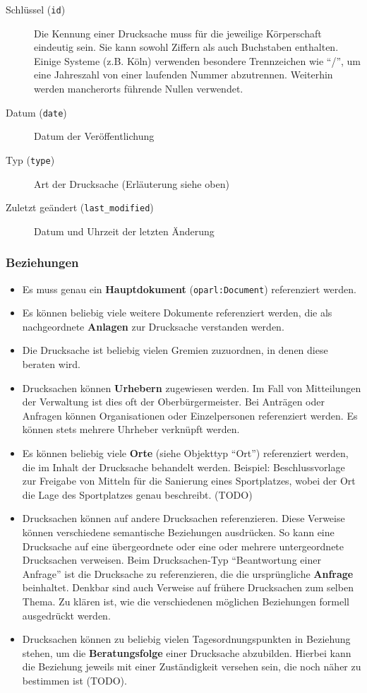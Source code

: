 \documentclass[,a4paper]{article}
\begin{document}
\begin{description}
\item[Schlüssel (\texttt{id})]
Die Kennung einer Drucksache muss für die jeweilige Körperschaft
eindeutig sein. Sie kann sowohl Ziffern als auch Buchstaben enthalten.
Einige Systeme (z.B. Köln) verwenden besondere Trennzeichen wie ``/'',
um eine Jahreszahl von einer laufenden Nummer abzutrennen. Weiterhin
werden mancherorts führende Nullen verwendet.
\item[Datum (\texttt{date})]
Datum der Veröffentlichung
\item[Typ (\texttt{type})]
Art der Drucksache (Erläuterung siehe oben)
\item[Zuletzt geändert (\texttt{last\_modified})]
Datum und Uhrzeit der letzten Änderung
\end{description}

\subsubsection{Beziehungen}

\begin{itemize}
\item
  Es muss genau ein \textbf{Hauptdokument} (\texttt{oparl:Document})
  referenziert werden.
\item
  Es können beliebig viele weitere Dokumente referenziert werden, die
  als nachgeordnete \textbf{Anlagen} zur Drucksache verstanden werden.
\item
  Die Drucksache ist beliebig vielen Gremien zuzuordnen, in denen diese
  beraten wird.
\item
  Drucksachen können \textbf{Urhebern} zugewiesen werden. Im Fall von
  Mitteilungen der Verwaltung ist dies oft der Oberbürgermeister. Bei
  Anträgen oder Anfragen können Organisationen oder Einzelpersonen
  referenziert werden. Es können stets mehrere Uhrheber verknüpft
  werden.
\item
  Es können beliebig viele \textbf{Orte} (siehe Objekttyp ``Ort'')
  referenziert werden, die im Inhalt der Drucksache behandelt werden.
  Beispiel: Beschlussvorlage zur Freigabe von Mitteln für die Sanierung
  eines Sportplatzes, wobei der Ort die Lage des Sportplatzes genau
  beschreibt. (TODO)
\item
  Drucksachen können auf andere Drucksachen referenzieren. Diese
  Verweise können verschiedene semantische Beziehungen ausdrücken. So
  kann eine Drucksache auf eine übergeordnete oder eine oder mehrere
  untergeordnete Drucksachen verweisen. Beim Drucksachen-Typ
  ``Beantwortung einer Anfrage'' ist die Drucksache zu referenzieren,
  die die ursprüngliche \textbf{Anfrage} beinhaltet. Denkbar sind auch
  Verweise auf frühere Drucksachen zum selben Thema. Zu klären ist, wie
  die verschiedenen möglichen Beziehungen formell ausgedrückt werden.
\item
  Drucksachen können zu beliebig vielen Tagesordnungspunkten in
  Beziehung stehen, um die \textbf{Beratungsfolge} einer Drucksache
  abzubilden. Hierbei kann die Beziehung jeweils mit einer Zuständigkeit
  versehen sein, die noch näher zu bestimmen ist (TODO).
\end{itemize}
\end{document}
